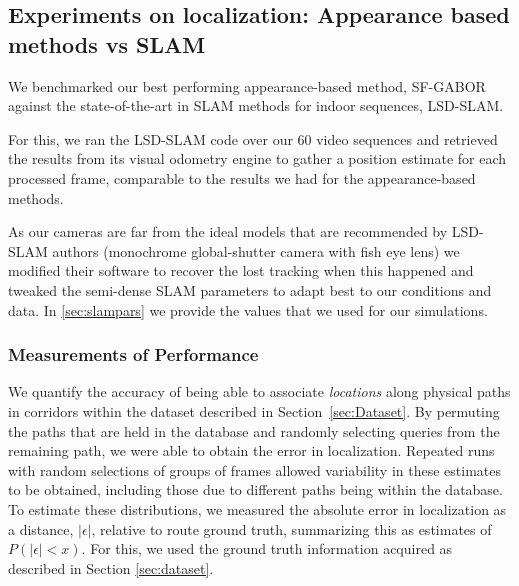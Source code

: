 \subsection{Experiments on localization: Appearance based methods vs SLAM}

We benchmarked our best performing appearance-based method, SF-GABOR against the state-of-the-art in SLAM methods for indoor sequences, LSD-SLAM.

For this, we ran the LSD-SLAM code over our 60 video sequences and retrieved the results from its visual odometry engine to gather a position estimate for each processed frame, comparable to the results we had for the appearance-based methods. 

As our cameras are far from the ideal models that are recommended by LSD-SLAM authors (monochrome global-shutter camera with fish eye lens) we modified their software to recover the lost tracking when this happened and tweaked the semi-dense SLAM parameters to adapt best to our conditions and data. In \ref{sec:slampars} we provide the values that we used for our simulations.

\subsubsection{Measurements of Performance}

We quantify the accuracy of being able to associate {\em locations} along physical paths in corridors within the dataset described in Section~\ref{sec:Dataset}. By permuting the paths that are held in the database and randomly selecting queries from the remaining path, we were able to obtain the error in localization.  Repeated runs with random selections of groups of frames allowed variability in these estimates to be obtained, including those due to different paths being within the database. To estimate these distributions, we measured the absolute error in localization as a distance, $|\epsilon|$, relative to route ground truth, summarizing this as estimates of $P(|\epsilon| < x)$. For this, we used the ground truth information acquired as described in Section \ref{sec:dataset}.  

